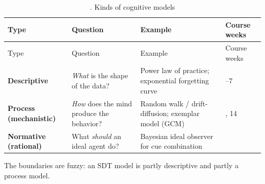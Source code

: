 \begin{longtable}[]{@{}
  >{\raggedright\arraybackslash}p{}
  >{\raggedright\arraybackslash}p{}
  >{\raggedright\arraybackslash}p{}
  >{\raggedright\arraybackslash}p{}@{}}
\caption{. Kinds of cognitive models}\tabularnewline
\toprule\noalign{}
\begin{minipage}[b]{\linewidth}\raggedright
Type
\end{minipage} & \begin{minipage}[b]{\linewidth}\raggedright
Question
\end{minipage} & \begin{minipage}[b]{\linewidth}\raggedright
Example
\end{minipage} & \begin{minipage}[b]{\linewidth}\raggedright
Course weeks
\end{minipage} \\
\midrule\noalign{}
\endfirsthead
\toprule\noalign{}
\begin{minipage}[b]{\linewidth}\raggedright
Type
\end{minipage} & \begin{minipage}[b]{\linewidth}\raggedright
Question
\end{minipage} & \begin{minipage}[b]{\linewidth}\raggedright
Example
\end{minipage} & \begin{minipage}[b]{\linewidth}\raggedright
Course weeks
\end{minipage} \\
\midrule\noalign{}
\endhead
\bottomrule\noalign{}
\endlastfoot
\textbf{Descriptive} & \emph{What} is the shape of the data? & Power law
of practice; exponential forgetting curve & 2--7 \\
\textbf{Process (mechanistic)} & \emph{How} does the mind produce the
behavior? & Random walk / drift-diffusion; exemplar model (GCM) & 1,
14 \\
\textbf{Normative (rational)} & What \emph{should} an ideal agent do? &
Bayesian ideal observer for cue combination & 15 \\
\end{longtable}

The boundaries are fuzzy: an SDT model is partly descriptive and partly
a process model.

